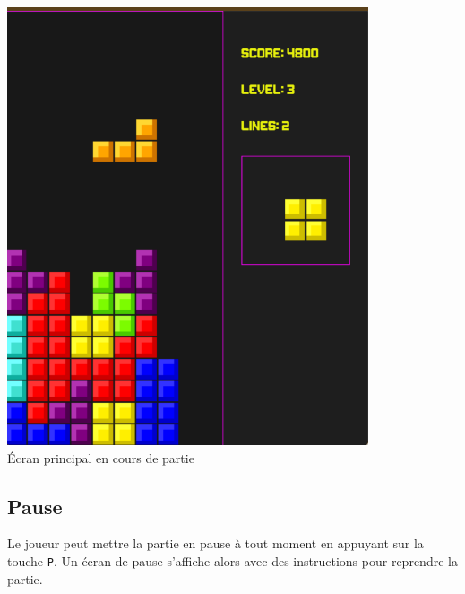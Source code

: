 \documentclass[12pt,a4paper]{report}
\begin{document}
\begin{center}
    \includegraphics[width=0.8\textwidth]{Figure_jeu.png}
    \\
    \caption{Écran principal en cours de partie}
    \label{fig:gameplay}
\end{center}

\newpage
\subsection{Pause}
Le joueur peut mettre la partie en pause à tout moment en appuyant sur la touche \texttt{P}. Un écran de pause s'affiche alors avec des instructions pour reprendre la partie.
\end{document}
